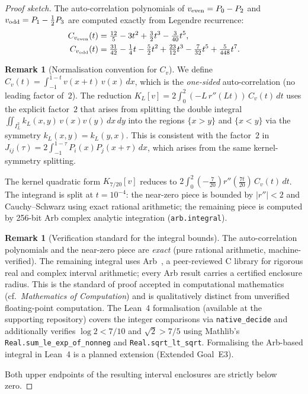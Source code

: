 \documentclass[12pt,a4paper]{amsart}
\theoremstyle{plain}
\theoremstyle{definition}
\newtheorem{remark}[theorem]{Remark}
\begin{document}
\begin{proof}[Proof sketch]
The auto-correlation polynomials of $v_{\rm even} = P_0 - P_2$ and
$v_{\rm odd} = P_1 - \tfrac12 P_3$ are computed exactly from Legendre
recurrence:
\begin{align*}
  C_{v_{\rm even}}(t) &= \tfrac{12}{5} - 3t^2 + \tfrac32 t^3
                         - \tfrac{3}{40}t^5, \\
  C_{v_{\rm odd}}(t)  &= \tfrac{31}{42} - \tfrac14 t - \tfrac52 t^2
                         + \tfrac{23}{12}t^3 - \tfrac{7}{32}t^5
                         + \tfrac{5}{448}t^7.
\end{align*}
\begin{remark}[Normalisation convention for $C_v$]
\label{rem:normalisation}
We define $C_v(t) = \int_{-1}^{1-t} v(x+t)\,v(x)\,dx$, which is the
\emph{one-sided} auto-correlation (no leading factor of~$2$).
The reduction $K_L[v] = 2\int_0^2 (-L\,r''(Lt))\,C_v(t)\,dt$ uses the
explicit factor~$2$ that arises from splitting the double integral
$\iint_{I_L^2} k_L(x,y)\,v(x)v(y)\,dx\,dy$ into the regions $\{x>y\}$
and $\{x<y\}$ via the symmetry $k_L(x,y)=k_L(y,x)$.
This is consistent with the factor~$2$ in $J_{ij}(\tau) = 2\int_{-1}^{1-\tau}
P_i(x)P_j(x+\tau)\,dx$, which arises from the same kernel-symmetry splitting.
\end{remark}
The kernel quadratic form $K_{7/20}[v]$ reduces to
$2\int_0^2 (-\tfrac{7}{20})r''(\tfrac{7t}{20})\,C_v(t)\,dt$.
The integrand is split at $t = 10^{-4}$: the near-zero piece is bounded by
$|r''| < 2$ and Cauchy--Schwarz using exact rational arithmetic;
the remaining piece is computed by 256-bit Arb complex analytic integration
(\texttt{arb.integral}).

\begin{remark}[Verification standard for the integral bounds]
The auto-correlation polynomials and the near-zero piece are \emph{exact}
(pure rational arithmetic, machine-verified).
The remaining integral uses Arb~\cite{Johansson2017}, a peer-reviewed
C library for rigorous real and complex interval arithmetic; every Arb
result carries a certified enclosure radius.
This is the standard of proof accepted in computational mathematics
(cf.\ \textit{Mathematics of Computation}) and is qualitatively distinct
from unverified floating-point computation.
The Lean~4 formalisation (available at the supporting repository)
covers the integer comparisons via \texttt{native\_decide} and
additionally verifies $\log 2 < 7/10$ and $\sqrt{2} > 7/5$ using
Mathlib's \texttt{Real.sum\_le\_exp\_of\_nonneg} and
\texttt{Real.sqrt\_lt\_sqrt}. Formalising the Arb-based integral
in Lean~4 is a planned extension (Extended Goal~E3).
\end{remark}
Both upper endpoints of the resulting interval enclosures are strictly
below zero.
\end{proof}
\end{document}
